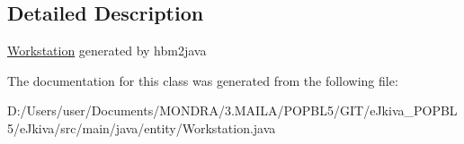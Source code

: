 \subsection{Detailed Description}
\mbox{\hyperlink{classentity_1_1_workstation}{Workstation}} generated by hbm2java 

The documentation for this class was generated from the following file\+:\begin{DoxyCompactItemize}
\item 
D\+:/\+Users/user/\+Documents/\+M\+O\+N\+D\+R\+A/3.\+M\+A\+I\+L\+A/\+P\+O\+P\+B\+L5/\+G\+I\+T/e\+Jkiva\+\_\+\+P\+O\+P\+B\+L5/e\+Jkiva/src/main/java/entity/Workstation.\+java\end{DoxyCompactItemize}
